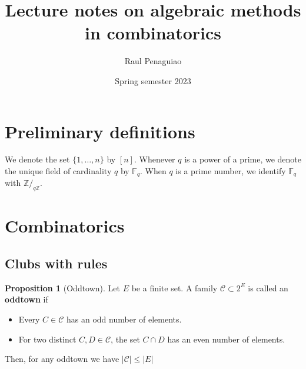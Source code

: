 \documentclass[12pt]{amsart}
\theoremstyle{definition}
\newtheorem{prop}[thm]{Proposition}
\newcommand{\Z}{\mathbb{Z}}
\newcommand{\F}{\mathbb{F}}
\newcommand{\CC}{\mathcal C}
\begin{document}
\title{Lecture notes on algebraic methods in combinatorics} %

\author{Raul Penaguiao}
\address{Max Planck Institute for the Sciences Leipzig}
\subjclass[2010]{}
\date{Spring semester 2023} %


\maketitle


\section{Preliminary definitions}

We denote the set $\{1, \dots, n\}$ by $[n]$.
Whenever $q$ is a power of a prime, we denote the unique field of cardinality $q$ by $\F_q$.
When $q$ is a prime number, we identify $\F_q$ with $\Z/_{q\Z}$.

\section{Combinatorics}

\subsection{Clubs with rules}


\begin{prop}[Oddtown]
Let $E$ be a finite set.
A family $\CC \subset 2^E $ is called an \textbf{oddtown} if
\begin{itemize}
\item Every $C \in \CC $ has an odd number of elements.

\item For two distinct $C, D \in \CC$, the set $C\cap D$ has an even number of elements.
\end{itemize}

Then, for any oddtown we have $|\CC| \leq |E|$
\end{prop}
\end{document}
